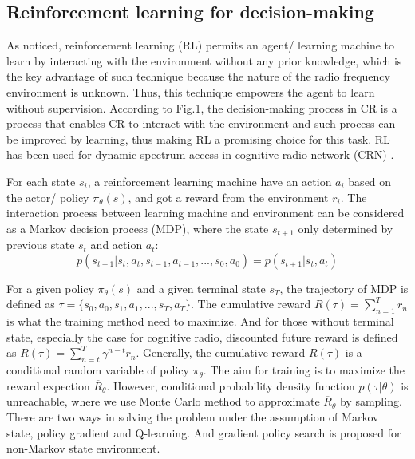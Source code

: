 \documentclass[journal]{IEEEtran}
\begin{document}
\subsection{Reinforcement learning for decision-making}
As noticed, reinforcement learning (RL) permits an agent/ learning machine to learn by interacting with the environment \cite{sutton1998reinforcement} without any prior knowledge, which is the key advantage of such technique because the nature of the radio frequency environment is unknown. Thus, this technique empowers the agent to learn without supervision. According to Fig.1, the decision-making process in CR is a process that enables CR to interact with the environment and such process can be improved by learning, thus making RL a promising choice for this task. RL has been used for dynamic spectrum access in cognitive radio network (CRN) \cite{yau2010applications}.

For each state $s_i$, a reinforcement learning machine have an action $a_i$ based on the actor/ policy $\pi_\theta (s)$, and got a reward from the environment $r_i$. The interaction process between learning machine and environment can be considered as a Markov decision process (MDP), where the state $s_{t+1}$ only determined by previous state $s_t$ and action $a_t$:
\begin{equation}
  p(s_{t+1}|s_t,a_t,s_{t-1},a_{t-1},...,s_{0},a_0) = p(s_{t+1}|s_t,a_t)
\end{equation}

For a given policy $\pi_\theta (s)$ and a given terminal state $s_T$, the trajectory of MDP is defined as $\tau = \{s_0,a_0,s_1,a_1,...,s_T,a_T\}$. The  cumulative reward $R(\tau)=\sum \limits_{n=1}^T r_n$ is what the training method need to maximize. And for those without terminal state, especially the case for cognitive radio, discounted future reward is defined as $R(\tau)=\sum \limits_{n=t}^T \gamma^{n-t}r_n$. Generally, the  cumulative reward $R(\tau)$ is a conditional random variable of policy $\pi_\theta$. The aim for training is to maximize the reward expection $\overline{R}_\theta$. However, conditional probability density function $p(\tau|\theta)$ is unreachable, where we use Monte Carlo method to approximate $\overline{R}_\theta$ by sampling. There are two ways in solving the problem under the assumption of Markov state, policy gradient and Q-learning. And gradient policy search is proposed for non-Markov state environment.



%
%
\end{document}
